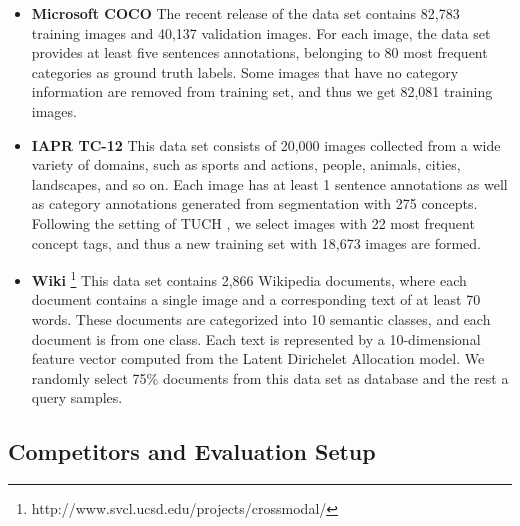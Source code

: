 \documentclass[10pt,journal,twocolumn]{IEEEtran}
\begin{document}
\begin{itemize}
\item \textbf{Microsoft COCO} \cite{Microsoft-COCO} The recent release of the data set contains 82,783 training images and 40,137 validation images. For each image, the data set provides at least five sentences annotations, belonging to 80 most frequent categories as ground truth labels. Some images that have no category information are removed from training set, and thus we get 82,081 training images.
\item \textbf{IAPR TC-12} \cite{IAPR-TC} This data set consists of 20,000 images collected from a wide variety of domains, such as sports and actions, people, animals, cities, landscapes, and so on. Each image has at least 1 sentence annotations as well as category annotations generated from segmentation with 275 concepts. Following the setting of TUCH \cite{TUCH}, we select images with 22 most frequent concept tags, and thus a new training set with 18,673 images are formed.
\item \textbf{Wiki} \footnote{http://www.svcl.ucsd.edu/projects/crossmodal/} This data set contains 2,866 Wikipedia documents, where each document contains a single image and a corresponding text of at least 70 words. These documents are categorized into 10 semantic classes, and each document is from one class. Each text is represented by a 10-dimensional feature vector computed from the Latent Dirichelet Allocation model. We randomly select 75\% documents from this data set as database and the rest a query samples.
\end{itemize}



\subsection{Competitors and Evaluation Setup}
\end{document}
